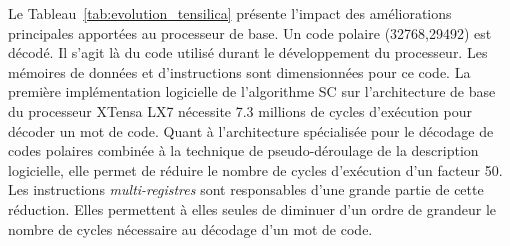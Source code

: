Le Tableau~\ref{tab:evolution_tensilica} présente l'impact des améliorations principales apportées au processeur de base. Un code polaire (32768,29492) est décodé. Il s'agit là du code utilisé durant le développement du processeur. Les mémoires de données et d'instructions sont dimensionnées pour ce code. La première implémentation logicielle de l'algorithme SC sur l'architecture de base du processeur XTensa LX7 nécessite 7.3 millions de cycles d'exécution pour décoder un mot de code. Quant à l'architecture spécialisée pour le décodage de codes polaires combinée à la technique de pseudo-déroulage de la description logicielle, elle permet de réduire le nombre de cycles d'exécution d'un facteur 50. Les instructions \textit{multi-registres} sont responsables d'une grande partie de cette réduction. Elles permettent à elles seules de diminuer d'un ordre de grandeur le nombre de cycles nécessaire au décodage d'un mot de code.
 \begin{table}[htp]
    \renewcommand{\arraystretch}{1.1}
    \centering
    \caption{Impact de chaque amélioration de l'ASIP sur le nombre de cycles d'horloges nécessaires pour décoder une trame, le débit et la surface occupée. La taille des mémoires n'est pas prise en compte pour la surface occupée. Fréquence considérée : 835 MHz.}
    \label{tab:evolution_tensilica}
    {\small{}}
  \end{table}


